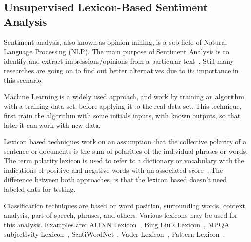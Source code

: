 \subsection{Unsupervised Lexicon-Based Sentiment Analysis}

Sentiment analysis, also known as opinion mining, is a sub-field of Natural Language Processing (NLP)\cite{Indurkhya:2010}. The main purpose of Sentiment Analysis is to identify and extract impressions/opinions from a particular text~\cite{vader}. Still many researches are going on to find out better alternatives due to its importance in this scenario\cite{DEVIKA201644}. 

Machine Learning is a widely used approach, and work by training an algorithm with a training data set, before applying it to the real data set\cite{DEVIKA201644}. This technique, first train the algorithm with some initials inputs, with known outputs, so that later it can work with new data\cite{He:2012}.

Lexicon based techniques work on an assumption that the collective polarity of a sentence or documents is the sum of polarities of the individual phrases or words\cite{DEVIKA201644}. The term polarity lexicon is used to refer to a dictionary or vocabulary with the indications of positive and negative words with an associated score~\cite{Dipanjan:2016}. The difference between both approaches, is that the lexicon based doesn't need labeled data for testing. 

Classification techniques are based on word position, surrounding words, context analysis, part-of-speech, phrases, and others. Various lexicons may be used for this analysis. Examples are: AFINN Lexicon~\cite{afinn}\cite{anew}, Bing Liu's Lexicon~\cite{Jinda}, MPQA subjectivity Lexicon~\cite{Wilson}, SentiWordNet~\cite{esuli-sentiwordnet}\cite{baccianella-sentiwordnet}, Vader Lexicon~\cite{vader}, Pattern Lexicon~\cite{pattern}. 



